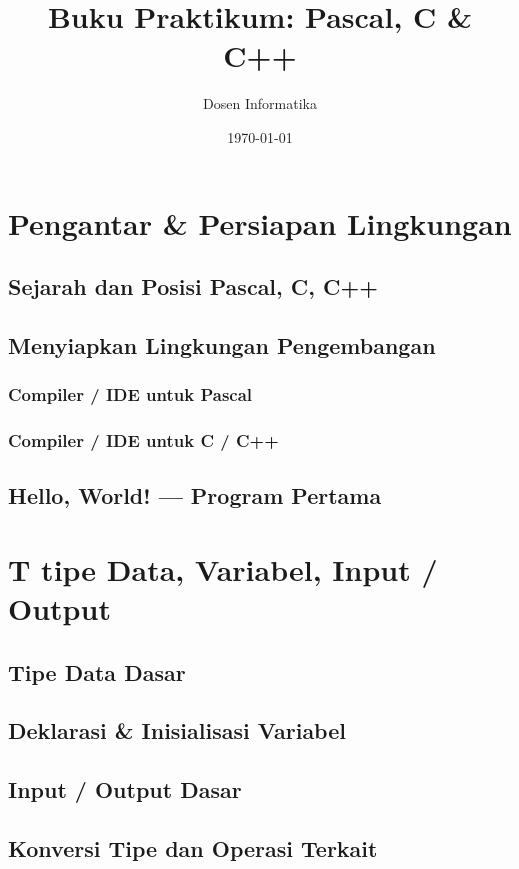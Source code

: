 \documentclass[12pt,a4paper]{book}
\begin{document}
\frontmatter
\title{Buku Praktikum: Pascal, C \& C++}
\author{Dosen Informatika}
\date{\today}
\maketitle
\tableofcontents

\mainmatter

\chapter{Pengantar \& Persiapan Lingkungan}
\section{Sejarah dan Posisi Pascal, C, C++}
\section{Menyiapkan Lingkungan Pengembangan}
\subsection{Compiler / IDE untuk Pascal}
\subsection{Compiler / IDE untuk C / C++}
\section{Hello, World! — Program Pertama}

\chapter{T tipe Data, Variabel, Input / Output}
\section{Tipe Data Dasar}
\section{Deklarasi \& Inisialisasi Variabel}
\section{Input / Output Dasar}
\section{Konversi Tipe dan Operasi Terkait}
\end{document}
